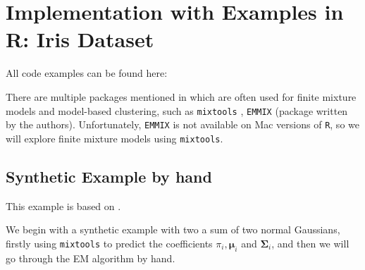 \documentclass{article}\usepackage[]{graphicx}\usepackage[]{xcolor}
\theoremstyle{plain}
\theoremstyle{definition}
\theoremstyle{remark}
\newcommand{\boldmu}{\boldsymbol{\mu}}
\newcommand{\boldSigma}{\boldsymbol{\Sigma}}
\begin{document}
\section{Implementation with Examples in R: Iris Dataset}\label{sec:Iris}

All code examples can be found here: \cite{GithubRepo}

There are multiple packages mentioned in \cite{annurev_FMMs} which are often used for finite mixture models and model-based clustering, such as \texttt{mixtools} \cite{Mixtools_Doc}, \texttt{EMMIX} (package written by the authors). Unfortunately, \texttt{EMMIX} is not available on Mac versions of \texttt{R}, so we will explore finite mixture models using \texttt{mixtools}.

\subsection{Synthetic Example by hand}
This example is based on \cite{EM_Implementation}.

We begin with a synthetic example with two a sum of two normal Gaussians, firstly using \texttt{mixtools} to predict the coefficients $\pi_i, \boldmu_i$ and $\boldSigma_i$, and then we will go through the EM algorithm by hand.
\end{document}

